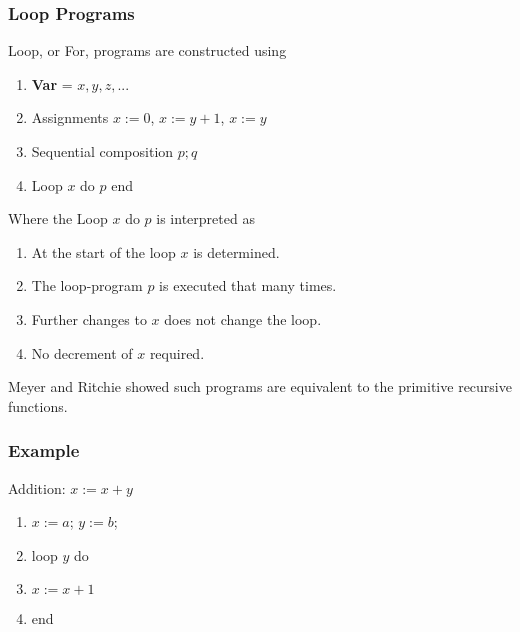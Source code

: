 \documentclass{beamer}
\begin{document}
\begin{frame}
	\frametitle{Loop Programs}

	Loop, or For, programs are constructed using 

	\begin{enumerate}
		\item[] {\bf Var} = $x,y,z,...$
		\item[] Assignments $x:=0$, $x:=y+1$, $x:=y$
		\item[] Sequential composition $p;q$
		\item[] Loop $x$ do $p$ end
	\end{enumerate}

	\vspace{0.5cm}

	Where the Loop $x$ do $p$ is interpreted as

	\begin{enumerate}
		\item[] At the start of the loop $x$ is determined.
		\item[] The loop-program $p$ is executed that many times. 
		\item[] Further changes to $x$ does not change the loop. 
		\item[] No decrement of $x$ required. 
	\end{enumerate}

	Meyer and Ritchie showed such programs are equivalent to the primitive recursive functions. 

\end{frame}

\begin{frame}
	\frametitle{Example}

	Addition: $x:= x + y$ 
	
	\vspace{0.5cm}

	\begin{enumerate}
		\item[] $x := a$; $y := b$;
		\item[] loop $y$ do 
		\item[] \hspace{0.5cm} $x := x + 1$
		\item[] end
	\end{enumerate}

	\vspace{5cm}



\end{frame}
\end{document}
